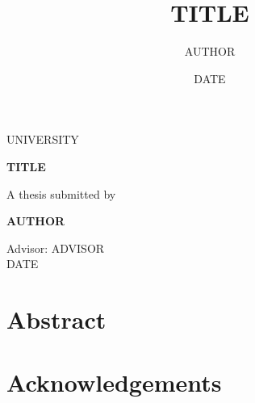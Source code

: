 \documentclass[12pt,a4paper,openright,twoside]{book}
\title{{{TITLE}}}
\author{{{AUTHOR}}}
\date{{{DATE}}}
\theoremstyle{definition}
\begin{document}
\frontmatter

\begin{titlepage}
  \centering
  \vspace*{2cm}
  {\Large {{UNIVERSITY}}}\\[0.5cm]
  \vspace{2cm}
  {\Huge\bfseries {{TITLE}} \par}
  \vspace{2cm}
  {\Large A thesis submitted by\par}
  {\Large\textbf{{{AUTHOR}}}\par}
  \vfill
  Advisor: {{ADVISOR}}\\
  {{DATE}}
\end{titlepage}

\chapter*{Abstract}


\chapter*{Acknowledgements}


\tableofcontents
\listoffigures
\listoftables

\mainmatter







\backmatter

\printbibliography[heading=bibintoc, title={References}]
\end{document}
